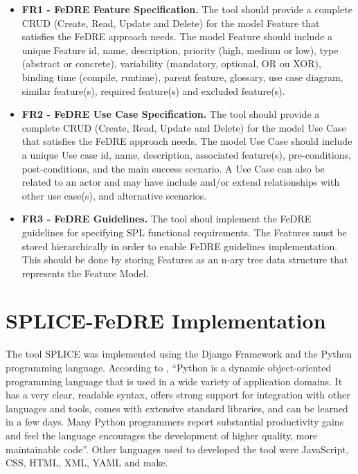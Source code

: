 \begin{itemize}
\item  \textbf{FR1 - FeDRE Feature Specification.} The tool should provide a complete 
\ac{CRUD} (Create, Read, Update and Delete) for the model Feature that satisfies the \ac{FeDRE} 
approach needs. The model Feature should include a unique Feature id, name, description, 
priority (high, medium or low), type (abstract or concrete), variability (mandatory, optional, OR ou XOR), 
binding time (compile, runtime),  parent feature, glossary, use case diagram, similar feature(s), 
required feature(s) and excluded feature(s).

\item  \textbf{FR2 - FeDRE Use Case Specification.} The tool should provide a
complete \ac{CRUD} (Create, Read, Update and Delete) for the model Use Case that satisfies the 
\ac{FeDRE} approach needs. The model Use Case should include a unique Use case id,  name,  description, 
associated feature(s), pre-conditions, post-conditions, and the main success scenario. A Use Case can 
also be related to an actor and may have include and/or extend relationships with other use case(s), 
and alternative scenarios.

\item  \textbf{FR3 - FeDRE Guidelines.} The tool shoul implement the \ac{FeDRE}
guidelines for specifying \ac{SPL} functional requirements.  The Features must be stored  
hierarchically in order to enable \ac{FeDRE} guidelines implementation. This  should be done by 
storing Features as an n-ary tree data structure that  represents the Feature Model. 

\end{itemize}

\section{SPLICE-FeDRE Implementation}
\label{sc:implementation}

The tool \ac{SPLICE} was implemented using the Django Framework and the Python programming language. 
According to \citep{python2014}, “Python is a dynamic object-oriented
programming language that is used in a wide variety of application domains. It has a very clear, readable syntax, 
offers strong support for integration with other languages and tools, comes with extensive standard 
libraries, and can be learned in a few days. Many Python programmers report substantial productivity 
gains and feel the language encourages the development of higher quality, more maintainable code”. 
Other languages used to developed the tool were JavaScript, CSS, HTML, XML, YAML and make.

